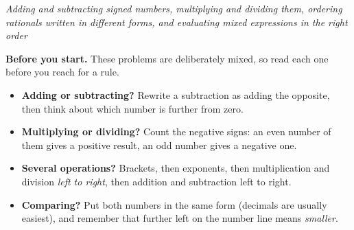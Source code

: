 \documentclass[12pt]{article}
\begin{document}

\begin{center}
\textit{Adding and subtracting signed numbers, multiplying and dividing them,
ordering rationals written in different forms, and evaluating mixed expressions
in the right order}
\end{center}

\noindent\textbf{Before you start.} These problems are deliberately mixed, so
read each one before you reach for a rule.
\begin{itemize}[leftmargin=1.2cm, itemsep=2pt, topsep=2pt]
\item \textbf{Adding or subtracting?} Rewrite a subtraction as adding the
opposite, then think about which number is further from zero.
\item \textbf{Multiplying or dividing?} Count the negative signs: an even
number of them gives a positive result, an odd number gives a negative one.
\item \textbf{Several operations?} Brackets, then exponents, then
multiplication and division \emph{left to right}, then addition and
subtraction left to right.
\item \textbf{Comparing?} Put both numbers in the same form (decimals are
usually easiest), and remember that further left on the number line means
\emph{smaller}.
\end{itemize}

\vspace{0.2cm}






\end{document}
